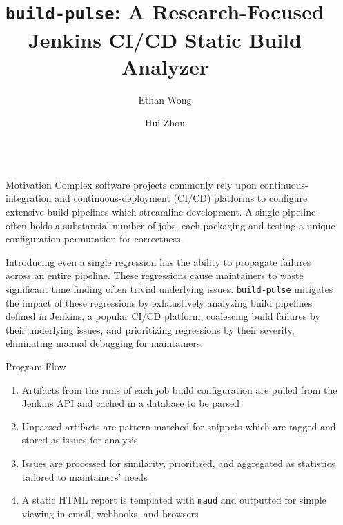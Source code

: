 \documentclass[final]{beamer}
\title{\texttt{build-pulse}: A Research-Focused Jenkins CI/CD Static Build
  Analyzer}
\author{Ethan Wong \inst{1}\inst{2} \and Hui Zhou \inst{2}}
\institute[shortinst]{\inst{1} University of Illinois at Chicago
  \samelineand \inst{2} Argonne National Laboratory}
\newlength{\sepwidth}
\newlength{\colwidth}
\newcommand{\separatorcolumn}{\begin{column}{\sepwidth}\end{column}}
\begin{document}
  \begin{frame}[t]
    \begin{columns}[t]
      \separatorcolumn

      \begin{column}{\colwidth}
        \begin{alertblock}{Motivation}
          Complex software projects commonly rely upon continuous-integration
          and continuous-deployment (CI/CD) platforms to configure extensive
          build pipelines which streamline development. A single pipeline often
          holds a substantial number of jobs, each packaging and testing a
          unique configuration permutation for correctness.

          Introducing even a single regression has the ability to propagate
          failures across an entire pipeline. These regressions cause
          maintainers to waste significant time finding often trivial underlying
          issues. \texttt{build-pulse\cite{github}} mitigates the impact of
          these regressions by exhaustively analyzing build pipelines defined in
          Jenkins, a popular CI/CD platform, coalescing build failures by their
          underlying issues, and prioritizing regressions by their severity,
          eliminating manual debugging for maintainers.
        \end{alertblock}

        \begin{exampleblock}{Program Flow}
          \begin{enumerate}
            \item Artifacts from the runs of each job build configuration are
              pulled from the Jenkins API and cached in a database to be parsed
            \item Unparsed artifacts are pattern matched for snippets which are
              tagged and stored as issues for analysis
            \item Issues are processed for similarity, prioritized, and
              aggregated as statistics tailored to maintainers' needs
            \item A static HTML report is templated with \texttt{maud} and
              outputted for simple viewing in email, webhooks, and browsers
          \end{enumerate}

          \begin{figure}
            \centering
\end{figure}
\end{exampleblock}
\end{column}
\end{columns}
\end{frame}
\end{document}
